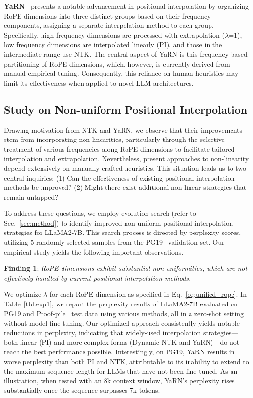 \textbf{YaRN}~\cite{yarn} presents a notable advancement in positional interpolation by organizing RoPE dimensions into three distinct groups based on their frequency components, assigning a separate interpolation method to each group. Specifically, high frequency dimensions are processed with extrapolation ($\lambda$=1), low frequency dimensions are interpolated linearly (PI), and those in the intermediate range use NTK. The central aspect of YaRN is this frequency-based partitioning of RoPE dimensions, which, however, is currently derived from manual empirical tuning. Consequently, this reliance on human heuristics may limit its effectiveness when applied to novel LLM architectures.

\subsection{Study on Non-uniform Positional Interpolation}

Drawing motivation from NTK and YaRN, we observe that their improvements stem from incorporating non-linearities, particularly through the selective treatment of various frequencies along RoPE dimensions to facilitate tailored interpolation and extrapolation. Nevertheless, present approaches to non-linearity depend extensively on manually crafted heuristics. This situation leads us to two central inquiries: (1) Can the effectiveness of existing positional interpolation methods be improved? (2) Might there exist additional non-linear strategies that remain untapped?

To address these questions, we employ evolution search (refer to Sec.~\ref{sec:method}) to identify improved non-uniform positional interpolation strategies for LLaMA2-7B. This search process is directed by perplexity scores, utilizing 5 randomly selected samples from the PG19~\cite{pg19} validation set. Our empirical study yields the following important observations.

\textbf{Finding 1}: \textit{RoPE dimensions exhibit substantial non-uniformities, which are not effectively handled by current positional interpolation methods.}

We optimize $\lambda$ for each RoPE dimension as specified in Eq.~\ref{eq:unified_rope}. In Table~\ref{tbl:exp1}, we report the perplexity results of LLaMA2-7B evaluated on PG19 and Proof-pile~\cite{proof-pile} test data using various methods, all in a zero-shot setting without model fine-tuning. Our optimized approach consistently yields notable reductions in perplexity, indicating that widely-used interpolation strategies—both linear (PI) and more complex forms (Dynamic-NTK and YaRN)—do not reach the best performance possible. Interestingly, on PG19, YaRN results in worse perplexity than both PI and NTK, attributable to its inability to extend to the maximum sequence length for LLMs that have not been fine-tuned. As an illustration, when tested with an 8k context window, YaRN’s perplexity rises substantially once the sequence surpasses 7k tokens.

